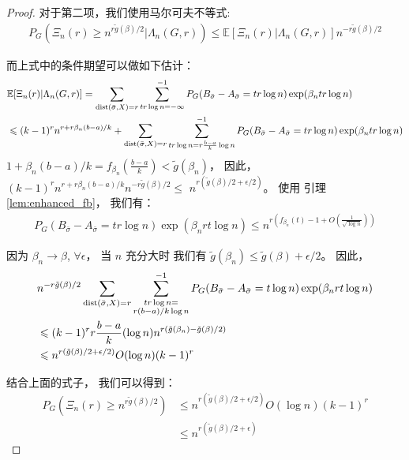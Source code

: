 \begin{proof}
  对于第二项，我们使用马尔可夫不等式:
  \begin{align*}
  P_G(\Xi_n(r) \geq n^{r \tilde{g}(\beta) /2} |\Lambda_n(G,r) )
  \leq \mathbb{E}[\Xi_n(r)|\Lambda_n(G,r)]n^{-r \tilde{g}(\beta) /2} 
  \end{align*}
  
  而上式中的条件期望可以做如下估计：
  \begin{align*}
  &\mathbb{E}[\Xi_n(r)|\Lambda_n(G,r)]=
  \sum_{\operatorname{dist}(\bar{\sigma}, X) = r}\sum_{tr\log n = -\infty }^{-1} 
   P_G(B_{\bar{\sigma}} -A_{\bar{\sigma}}=tr\log n)\exp(\beta_n tr \log n) \\
  & \leqslant (k-1)^r n^{r+r\beta_n(b-a)/k} +
  \sum_{\operatorname{dist}(\bar{\sigma}, X) = r}\sum_{tr\log n = r\frac{b-a}{k}\log n }^{-1} 
   P_G(B_{\bar{\sigma}} -A_{\bar{\sigma}}=tr\log n)\exp(\beta_n tr \log n)
  \end{align*}
  $1+\beta_n(b-a)/k = f_{\beta_n}(\frac{b-a}{k}) < \tilde{g}(\beta_n)$，
  因此，
  $(k-1)^r n^{r+r\beta_n (b-a)/k}n^{-r \tilde{g}(\beta) /2} \leq$
   $n^{r (\tilde{g}(\beta) /2 + \epsilon/2)} $。
  使用 引理 \ref{lem:enhanced_fb}， 我们有：
  \begin{align*}
  P_G(B_{\bar{\sigma}} -A_{\bar{\sigma}}=tr\log n)\exp(\beta_n rt \log n) \leq 
  n^{r(f_{\beta_n}(t)-1 + O(\frac{1}{\sqrt{\log n}}))}
  \end{align*}
  
  因为 $\beta_n \to \beta$, $\forall \epsilon$，
  当 $n$ 充分大时
  我们有 $\tilde{g}(\beta_n) \leq \tilde{g}(\beta) + \epsilon /2$。
  因此，
  \begin{align*}
  &n^{-r \tilde{g}(\beta) /2}\sum_{\operatorname{dist}(\bar{\sigma}, X) = r}\sum_{\substack{tr\log n = \\ r(b-a)/k\log n} }^{-1}
  P_G(B_{\bar{\sigma}} -A_{\bar{\sigma}}=t\log n)\exp(\beta_n rt \log n) \\
  & \leqslant  (k-1)^r r\frac{b-a}{k} ( \log n )
  n^{r(\tilde{g}(\beta_n) - \tilde{g}(\beta)/2)}\\
  & \leqslant  n^{r(\tilde{g}(\beta)/2 + \epsilon/2)} O(\log n) (k-1)^r
  \end{align*}
  
  结合上面的式子， 我们可以得到：
  \begin{align*}
  P_{G}(\Xi_n(r) \geq n^{r \tilde{g}(\beta) /2}) &\leq  n^{r(\tilde{g}(\beta)/2 + \epsilon/2)} O(\log n) (k-1)^r\\
  &\leq n^{r(\tilde{g}(\beta)/2 + \epsilon)}
  \end{align*}
  

\end{proof}
